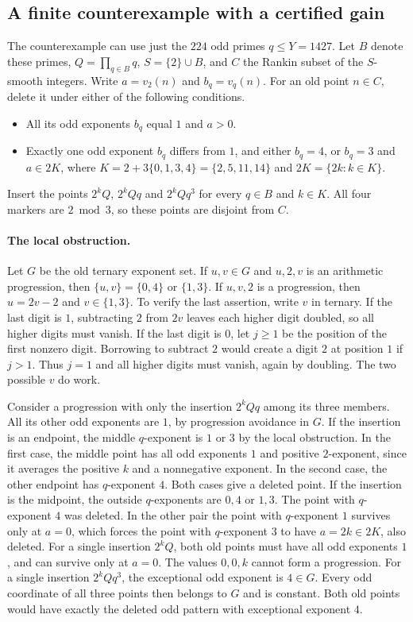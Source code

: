 \subsection{A finite counterexample with a certified gain}

The counterexample can use just the $224$ odd primes $q\le Y=1427$.
Let $B$ denote these primes, $Q=\prod_{q\in B}q$, $S=\{2\}\cup B$, and
$C$ the Rankin subset of the $S$-smooth integers. Write $a=v_2(n)$ and
$b_q=v_q(n)$. For an old point $n\in C$, delete it under either of the
following conditions.
\begin{itemize}
\item All its odd exponents $b_q$ equal $1$ and $a>0$.
\item Exactly one odd exponent $b_q$ differs from $1$, and either $b_q=4$,
or $b_q=3$ and $a\in2K$, where $K=2+3\{0,1,3,4\}=\{2,5,11,14\}$ and $2K=\{2k:k\in K\}$.
\end{itemize}
Insert the points $2^kQ$, $2^kQq$ and $2^kQq^3$ for every $q\in B$ and $k\in K$.
All four markers are $2\bmod 3$, so these points are disjoint from $C$.

\paragraph{The local obstruction.}
Let $G$ be the old ternary exponent set.
If $u,v\in G$ and $u,2,v$ is an arithmetic progression, then
$\{u,v\}=\{0,4\}$ or $\{1,3\}$. If $u,v,2$ is a progression, then
$u=2v-2$ and $v\in\{1,3\}$. To verify the last assertion, write $v$
in ternary. If the last digit is $1$, subtracting $2$ from $2v$ leaves
each higher digit doubled, so all higher digits must vanish. If the
last digit is $0$, let $j\ge1$ be the position of the first nonzero
digit. Borrowing to subtract $2$ would create a digit $2$ at position
$1$ if $j>1$. Thus $j=1$ and all higher digits must vanish, again by
doubling. The two possible $v$ do work.

Consider a progression with only the insertion $2^kQq$ among its three
members. All its other odd exponents are $1$, by progression avoidance
in $G$. If the insertion is an endpoint, the middle $q$-exponent is
$1$ or $3$ by the local obstruction. In the first case, the middle
point has all odd exponents $1$ and positive $2$-exponent, since it
averages the positive $k$ and a nonnegative exponent. In the second
case, the other endpoint has $q$-exponent $4$. Both cases give a
deleted point. If the insertion is the midpoint, the outside
$q$-exponents are $0,4$ or $1,3$. The point with $q$-exponent $4$
was deleted. In the other pair the point with $q$-exponent $1$ survives
only at $a=0$, which forces the point with $q$-exponent $3$ to have
$a=2k\in2K$, also deleted. For a single insertion $2^kQ$, both
old points must have all odd exponents $1$, and can survive only at
$a=0$. The values $0,0,k$ cannot form a progression. For a single insertion $2^kQq^3$, the exceptional odd exponent is $4\in G$. Every odd coordinate of all three points then belongs to $G$ and is constant. Both old points would have exactly the deleted odd pattern with exceptional exponent $4$.

